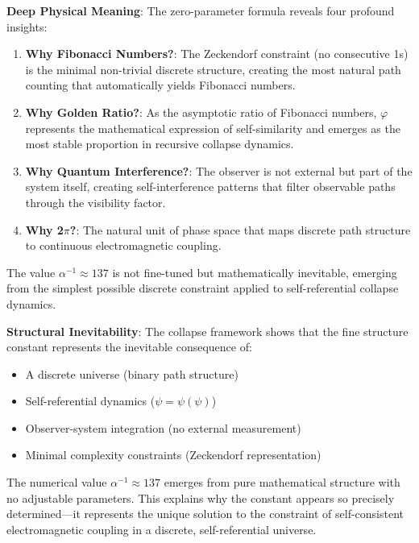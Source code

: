\documentclass[%
 reprint,
 amsmath,amssymb,
 aps,
 prd,
 10pt,
 nofootinbib,      %
 longbibliography  %
]{revtex4-2}
\theoremstyle{definition}
\theoremstyle{remark}
\begin{document}
\textbf{Deep Physical Meaning}: The zero-parameter formula reveals four profound insights:

\begin{enumerate}
\item \textbf{Why Fibonacci Numbers?}: The Zeckendorf constraint (no consecutive 1s) is the minimal non-trivial discrete structure, creating the most natural path counting that automatically yields Fibonacci numbers.

\item \textbf{Why Golden Ratio?}: As the asymptotic ratio of Fibonacci numbers, $\varphi$ represents the mathematical expression of self-similarity and emerges as the most stable proportion in recursive collapse dynamics.

\item \textbf{Why Quantum Interference?}: The observer is not external but part of the system itself, creating self-interference patterns that filter observable paths through the visibility factor.

\item \textbf{Why 2$\pi$?}: The natural unit of phase space that maps discrete path structure to continuous electromagnetic coupling.
\end{enumerate}

The value $\alpha^{-1} \approx 137$ is not fine-tuned but mathematically inevitable, emerging from the simplest possible discrete constraint applied to self-referential collapse dynamics.

\textbf{Structural Inevitability}: The collapse framework shows that the fine structure constant represents the inevitable consequence of:
\begin{itemize}
\item A discrete universe (binary path structure)
\item Self-referential dynamics ($\psi = \psi(\psi)$)
\item Observer-system integration (no external measurement)
\item Minimal complexity constraints (Zeckendorf representation)
\end{itemize}

The numerical value $\alpha^{-1} \approx 137$ emerges from pure mathematical structure with no adjustable parameters. This explains why the constant appears so precisely determined—it represents the unique solution to the constraint of self-consistent electromagnetic coupling in a discrete, self-referential universe.
\end{document}

